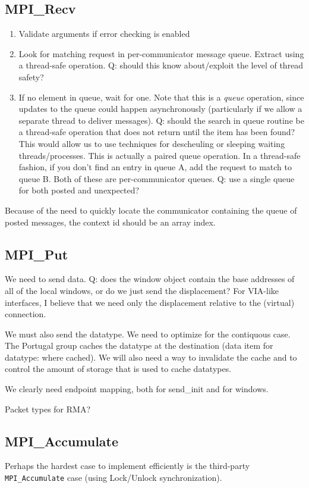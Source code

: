\documentclass{article}
\let\code=\texttt
\begin{document}
\subsection{MPI\_Recv}
\begin{enumerate}
\item Validate arguments if error checking is enabled
\item Look for matching request in per-communicator message queue.  Extract
  using a thread-safe operation.  Q: should this know about/exploit the level
  of thread safety?
\item If no element in queue, wait for one.  Note that this is a \emph{queue}
  operation, since updates to the queue could happen asynchronously
  (particularly if we allow a separate thread to deliver messages).  Q: should
  the search in queue routine be a thread-safe operation that does not return
  until the item has been found?  This would allow us to use techniques for
  descheuling or sleeping waiting threads/processes.
  This is actually a paired queue operation.  In a thread-safe fashion, if you
  don't find an entry in queue A, add the request to match to queue B.  Both
  of these are per-communicator queues.  Q: use a single queue for both posted
  and unexpected?
\end{enumerate}

Because of the need to quickly locate the communicator containing the queue of
posted messages, the context id should be an array index.

\subsection{MPI\_Put}
We need to send data.  Q: does the window object contain the base addresses of
all of the local windows, or do we just send the displacement?  For VIA-like
interfaces, I believe that we need only the displacement relative to the
(virtual) connection.

We must also send the datatype.  We need to optimize for the contiquous case.
The Portugal group caches the datatype at the destination (data item for
datatype: where cached).  We will also need a way to invalidate the cache and
to control the amount of storage that is used to cache datatypes.

We clearly need endpoint mapping, both for send\_init and for windows.

Packet types for RMA?

\subsection{MPI\_Accumulate}
Perhaps the hardest case to implement efficiently is the third-party
\code{MPI\_Accumulate} case (using Lock/Unlock synchronization).
\end{document}
